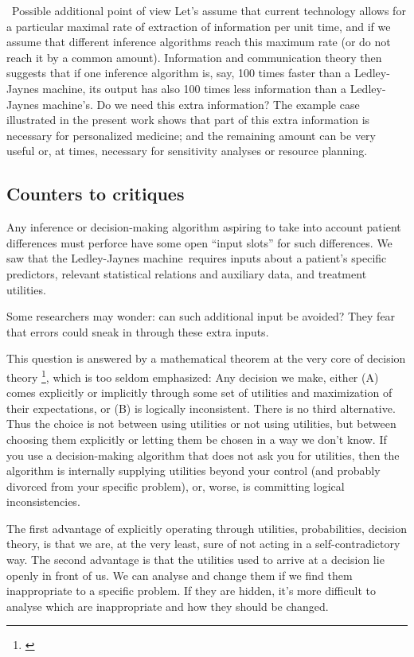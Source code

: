 \documentclass[utf8]{FrontiersinHarvard} %
\newcommand*{\pencil}{{\fontencoding{U}\fontfamily{fontawesometwo}\selectfont\symbol{210}}}
\newcommand{\mynotep}[1]{{\color{notecolour}\pencil\ #1}}
\renewcommand*{\|}[1][]{\nonscript\:#1\vert\nonscript\:\mathopen{}}
\newcommand*{\ljm}{Ledley-Jaynes machine}
\begin{document}
\mynotep{Possible additional point of view} Let's assume that current technology allows for a particular maximal rate of extraction of information per unit time, and if we assume that different inference algorithms reach this maximum rate (or do not reach it by a common amount). Information and communication theory \citep[I--II]{mackay1995_r2005} then suggests that if one inference algorithm is, say, 100 times faster than a \ljm, its output has also 100 times less information than a \ljm's. Do we need this extra information? The example case illustrated in the present work shows that part of this extra information is necessary for personalized medicine; and the remaining amount can be very useful or, at times, necessary for sensitivity analyses or resource planning.

\subsection{Counters to critiques}
\label{sec:critics}

Any inference or decision-making algorithm aspiring to take into account patient differences must perforce have some open \enquote{input slots} for such differences. We saw that the \ljm\ requires inputs about a patient's specific predictors, relevant statistical relations and auxiliary data, and treatment utilities.

Some researchers may wonder: can such additional input be avoided? They fear that errors could sneak in through these extra inputs.

This question is answered by a mathematical theorem at the very core of decision theory \footnote{\citet{savage1954_r1972,luceetal1957,raiffaetal1961_r2000,atkinsonetal1964,ferguson1967,lindley1971_r1988,kreps1988,bernardoetal1994_r2000,prattetal1995_r1996,lindley2006_r2014,pettigrew2011_r2019}}, which is too seldom emphasized: Any decision we make, either (A) comes explicitly or implicitly through some set of utilities and maximization of their expectations, or (B) is logically inconsistent. There is no third alternative. Thus the choice is not between using utilities or not using utilities, but between choosing them explicitly or letting them be chosen in a way we don't know. If you use a decision-making algorithm that does not ask you for utilities, then the algorithm is internally supplying utilities beyond your control (and probably divorced from your specific problem), or, worse, is committing logical inconsistencies.

The first advantage of explicitly operating through utilities, probabilities, decision theory, is that we are, at the very least, sure of not acting in a self-contradictory way. The second advantage is that the utilities used to arrive at a decision lie openly in front of us. We can analyse and change them if we find them inappropriate to a specific problem. If they are hidden, it's more difficult to analyse which are inappropriate and how they should be changed.
\end{document}
